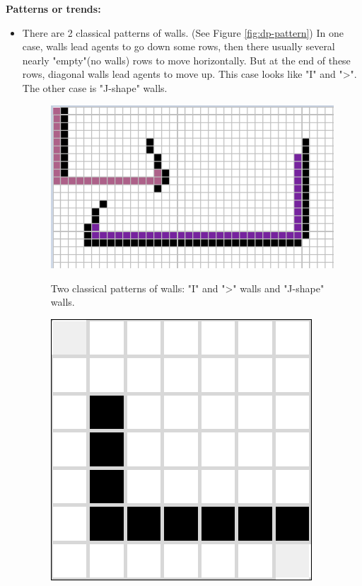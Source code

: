 \documentclass[letter]{article}
\begin{document}
\begin{enumerate}[resume]
\begin{enumerate}
\begin{enumerate}
\begin{figure}
				\end{figure}
				\textbf{Patterns or trends:} 
				\begin{itemize}
					\item {There are 2 classical patterns of walls. (See Figure \ref{fig:dp-pattern}) In one case, walls lead agents to go down some rows, then there usually several nearly "empty"(no walls) rows to move horizontally. But at the end of these rows, diagonal walls lead agents to move up. This case looks like "I" and ">". The other case is "J-shape" walls. }
					\begin{figure}
							\includegraphics[width=\textwidth]{../pics/dp/pattern.png}
							\caption{\label{fig:dp-pattern}Two classical patterns of walls: "I" and ">" walls and "J-shape" walls.}
						\endminipage\hfill
							\includegraphics[width=\textwidth]{../pics/dp/hardest.png}
							\caption{\label{fig:dp-hardest}}
						\endminipage
					\end{figure}
				

\end{itemize}
\end{enumerate}
\end{enumerate}
\end{enumerate}
\end{document}
